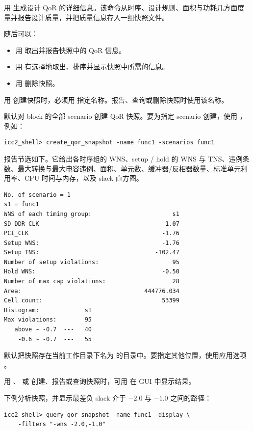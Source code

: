 用  生成设计 QoR 的详细信息。该命令从时序、设计规则、面积与功耗几方面度量并报告设计质量，并把质量信息存入一组快照文件。

随后可以：
\begin{itemize}
  \item 用  取出并报告快照中的 QoR 信息。
  \item 用  有选择地取出、排序并显示快照中所需的信息。
  \item 用  删除快照。
\end{itemize}

用  创建快照时，必须用  指定名称。报告、查询或删除快照时使用该名称。

默认对 block 的全部 scenario 创建 QoR 快照。要为指定 scenario 创建，使用 ，例如：
\begin{lstlisting}
icc2_shell> create_qor_snapshot -name func1 -scenarios func1
\end{lstlisting}

报告节选如下。它给出各时序组的 WNS、setup / hold 的 WNS 与 TNS、违例条数、最大转换与最大电容违例、面积、单元数、缓冲器/反相器数量、标准单元利用率、CPU 时间与内存，以及 slack 直方图。
\begin{lstlisting}
No. of scenario = 1
s1 = func1
WNS of each timing group:                       s1
SD_DDR_CLK                                    1.07
PCI_CLK                                      -1.76
Setup WNS:                                   -1.76
Setup TNS:                                 -102.47
Number of setup violations:                     95
Hold WNS:                                    -0.50
Number of max cap violations:                   28
Area:                                   444776.034
Cell count:                                  53399
Histogram:             s1
Max violations:        95
   above ~ -0.7  ---   40
    -0.6 ~ -0.7  ---   55
\end{lstlisting}

默认把快照存在当前工作目录下名为  的目录中。要指定其他位置，使用应用选项 。

用 、 或  创建、报告或查询快照时，可用  在 GUI 中显示结果。

下例分析快照，并显示最差负 slack 介于 $-2.0$ 与 $-1.0$ 之间的路径：
\begin{lstlisting}
icc2_shell> query_qor_snapshot -name func1 -display \
    -filters "-wns -2.0,-1.0"
\end{lstlisting}

